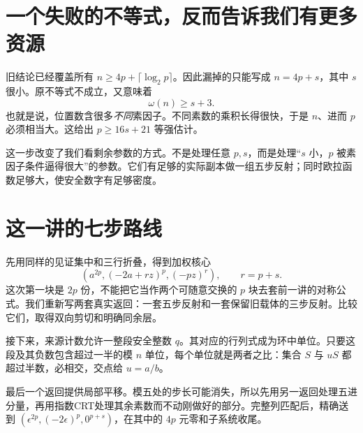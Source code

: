 \documentclass[11pt,a4paper,oneside,openany]{book}
\theoremstyle{definition}
\numberwithin{equation}{chapter}
\begin{document}
\section{一个失败的不等式，反而告诉我们有更多资源}
旧结论已经覆盖所有 $n\ge4p+\lceil\log_2p\rceil$。因此漏掉的只能写成 $n=4p+s$，其中 $s$ 很小。原不等式不成立，又意味着
\[\omega(n)\ge s+3.
\]
也就是说，位置数含很多\emph{不同}素因子。不同素数的乘积长得很快，于是 $n$、进而 $p$ 必须相当大。这给出 $p\ge16s+21$ 等强估计。

这一步改变了我们看剩余参数的方式。不是处理任意 $p,s$，而是处理“$s$ 小，$p$ 被素因子条件逼得很大”的参数。它们有足够的实际副本做一组五步反射；同时欧拉函数足够大，使安全数字有足够密度。

\section{这一讲的七步路线}
先用同样的见证集中和三行折叠，得到加权核心
\[(a^{2p},(-2a+rz)^p,(-pz)^r),\qquad r=p+s.
\]
这次第一块是 $2p$ 份，不能把它当作两个可随意交换的 $p$ 块去套前一讲的对称公式。我们重新写两套真实返回：一套五步反射和一套保留旧载体的三步反射。比较它们，取得双向剪切和明确同余层。

接下来，来源计数允许一整段安全整数 $q$。其对应的行列式成为环中单位。只要这段及其负数包含超过一半的模 $n$ 单位，每个单位就是两者之比：集合 $S$ 与 $uS$ 都超过半数，必相交，交点给 $u=a/b$。

最后一个返回提供局部平移。模五处的步长可能消失，所以先用另一返回处理五进分量，再用指数CRT处理其余素数而不动刚做好的部分。完整列匹配后，精确送到 $(\epsilon^{2p},(-2\epsilon)^p,0^{p+s})$，在其中的 $4p$ 元零和子系统收尾。
\end{document}
